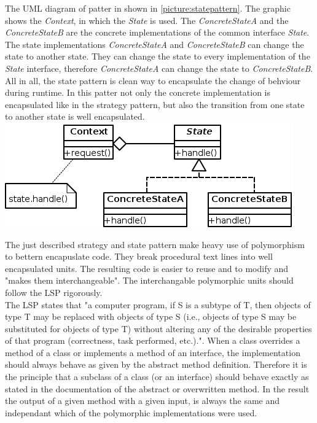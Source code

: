 The \acf{UML} diagram of patter in shown in \ref{picture:statepattern}. The graphic shows the \textit{Context}, in which the \textit{State} is used. The \textit{ConcreteStateA} and the \textit{ConcreteStateB} are the concrete implementations of the common interface \textit{State}. The state implementations  \textit{ConcreteStateA} and \textit{ConcreteStateB} can change the state to another state. They can change the state to every implementation of the \textit{State} interface, therefore \textit{ConcreteStateA} can change the state to \textit{ConcreteStateB}.
All in all, the state pattern is clean way to encapsulate the change of behviour during runtime. In this patter not only the concrete implementation is encapsulated like in the strategy pattern, but also the transition from one state to another state is well encapsulated. \\
\includegraphics{Bilder/StatePattern.svg.png}
\label{picture:statepattern}

The just described strategy and state pattern make heavy use of polymorphism to bettern encapuslate code. They break procedural text lines into well encapsulated units\cite{gof}. The resulting code is easier to reuse and to modify and "makes them interchangeable"\cite{gof}. The interchangable polymorphic units should follow the \acf{LSP} rigorously.\\

The \acf{LSP} states that "a computer program, if S is a subtype of T, then objects of type T may be replaced with objects of type S (i.e., objects of type S may be substituted for objects of type T) without altering any of the desirable properties of that program (correctness, task performed, etc.)."\cite[Liskov Substitution Priniple]{wiki}. When a class overrides a method of a class or implements a method of an interface, the implementation should always behave as given by the abstract method definition. Therefore it is the principle that a subclass of a class (or an interface) should behave exactly as stated in the documentation of the abstract or overwritten method. In the result the output of a given method with a given input, is always the same and independant which of the polymorphic implementations were used. \\


